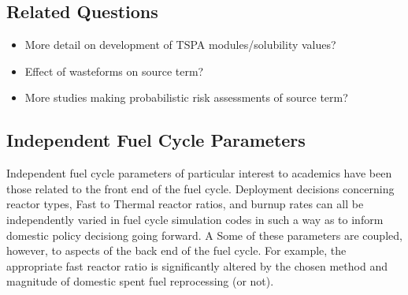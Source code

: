 \subsection{Related Questions}
\begin{itemize}
\item{} More detail on development of TSPA modules/solubility values?
\item{} Effect of wasteforms on source term? 
\item{} More studies making probabilistic risk assessments of source term?
\end{itemize}

\subsection{Independent Fuel Cycle Parameters}
Independent fuel cycle parameters of particular interest to academics have been those related to the 
front end of the fuel cycle. Deployment decisions concerning reactor types, Fast to Thermal reactor 
ratios, and burnup rates can all be independently varied in fuel cycle simulation codes in such a 
way as to inform domestic policy decisiong going forward. A Some of these parameters are coupled, 
however, to aspects of the back end of the fuel cycle. For example, the appropriate fast reactor 
ratio is significantly altered by the chosen method and magnitude of domestic spent fuel 
reprocessing (or not).

